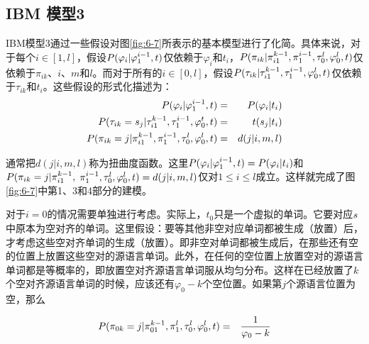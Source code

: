 
\subsection{IBM 模型3}

\parinterval IBM模型3通过一些假设对图\ref{fig:6-7}所表示的基本模型进行了化简。具体来说，对于每个$i\in[1,l]$，假设${P}(\varphi_i |\varphi_1^{i-1},{t})$仅依赖于$\varphi_i$和$t_i$，${P}(\pi_{ik}|\pi_{i1}^{k-1},\pi_1^{i-1},\tau_0^l,\varphi_0^l,{t})$仅依赖于$\pi_{ik}$、$i$、$m$和$l$。而对于所有的$i\in[0,l]$，假设${P}(\tau_{ik}|\tau_{i1}^{k-1},\tau_1^{i-1},\varphi_0^l,{t})$仅依赖于$\tau_{ik}$和$t_i$。这些假设的形式化描述为：
\vspace{-0.5em}
\begin{eqnarray}
{P}(\varphi_i|\varphi_1^{i-1},{t})                                                              & = &{{P}(\varphi_i|t_i)} \label{eq:6-10} \\
{P}(\tau_{ik} = s_j |\tau_{i1}^{k-1},\tau_{1}^{i-1},\varphi_0^t,{t})             & = & t(s_j|t_i) \label{eq:6-11} \\
{P}(\pi_{ik} = j |\pi_{i1}^{k-1},\pi_{1}^{i-1},\tau_{0}^{l},\varphi_{0}^{l},{t}) & = & d(j|i,m,l) \label{eq:6-12}
\end{eqnarray}

\parinterval 通常把$d(j|i,m,l)$称为扭曲度函数。这里${P}(\varphi_i|\varphi_1^{i-1},{t})={{P}(\varphi_i|t_i)}$和${{P}(\pi_{ik}=j|\pi_{i1}^{k-1},}$ $\pi_{1}^{i-1},\tau_0^l,\varphi_0^l,{t})=d(j|i,m,l)$仅对$1 \le i \le l$成立。这样就完成了图\ref{fig:6-7}中第1、3和4部分的建模。

\parinterval 对于$i=0$的情况需要单独进行考虑。实际上，$t_0$只是一个虚拟的单词。它要对应${s}$中原本为空对齐的单词。这里假设：要等其他非空对应单词都被生成（放置）后，才考虑这些空对齐单词的生成（放置）。即非空对单词都被生成后，在那些还有空的位置上放置这些空对的源语言单词。此外，在任何的空位置上放置空对的源语言单词都是等概率的，即放置空对齐源语言单词服从均匀分布。这样在已经放置了$k$个空对齐源语言单词的时候，应该还有$\varphi_0-k$个空位置。如果第$j$个源语言位置为空，那么

\begin{eqnarray}
{P}(\pi_{0k}=j|\pi_{01}^{k-1},\pi_1^l,\tau_0^l,\varphi_0^l,{t}) & = & \frac{1}{\varphi_0-k}
\label{eq:6-13}
\end{eqnarray}


